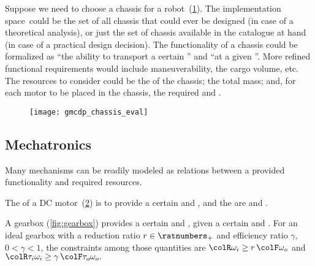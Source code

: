 \begin{example}
  \label{exa:chassis}
  Suppose we need to choose a chassis for a robot~(\cref{fig:gmcdp_chassis_eval}).
  The implementation space~\impsp could be the set of all chassis that could ever be designed (in case of a theoretical analysis), or just the set of chassis available in the catalogue at hand (in case
  of a practical design decision).
  The functionality of a chassis could be formalized as ``the ability to transport a certain '' and ``at a given ''.
  More refined functional requirements would include maneuverability, the cargo volume, etc.
  The resources to consider could be the  of the chassis; the total mass; and, for each motor to be placed in the chassis, the required  and .
\end{example}

\begin{figure}[h]
  \centering
  \texttt{[image: gmcdp\_chassis\_eval]}
  \caption{}
  \label{fig:gmcdp_chassis_eval}
\end{figure}

\subsection{Mechatronics}


Many mechanisms can be readily modeled as relations between a provided  functionality and required resources.


\begin{example}
  The  of a DC motor~(\cref{fig:dc_motor}) is to provide a certain  and , and the  are  and .
\end{example}

\begin{figure}[h]
  \begin{center}
  \end{center}
  \caption{}
  \label{fig:dc_motor}
\end{figure}


\begin{example}
  A gearbox (\cref{fig:gearbox}) provides a certain  and , given a certain
   and . For
  an ideal gearbox with a reduction ratio $r \in \ratnumbers_+$ and
  efficiency ratio $\gamma$, $0<\gamma<1$, the constraints among
  those quantities are ${\colR \omega_i}\geq r\,{\colF \omega_o}$
  and ${\colR \tau_i\omega_i}\geq\gamma\,{\colF \tau_o\omega_o}.$
\end{example}

